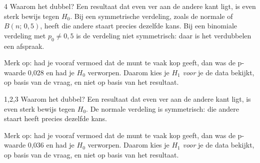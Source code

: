 \begin{alleenvoor}{4}
Waarom het dubbel? Een resultaat dat even ver aan de andere kant ligt, is even sterk bewijs tegen $H_0$. Bij een symmetrische verdeling, zoals de normale of $B(n;\, 0{,}5)$, heeft die andere staart precies dezelfde kans. Bij een binomiale verdeling met $p_0 \neq 0{,}5$ is de verdeling niet symmetrisch: daar is het verdubbelen een afspraak.


Merk op: had je vooraf vermoed dat de munt te vaak kop geeft, dan was de p-waarde 0,028 en had je $H_0$ verworpen. Daarom kies je $H_1$ \textit{voor} je de data bekijkt, op basis van de vraag, en niet op basis van het resultaat.
\end{alleenvoor}
\begin{alleenvoor}{1,2,3}
Waarom het dubbel? Een resultaat dat even ver aan de andere kant ligt, is even sterk bewijs tegen $H_0$. De normale verdeling is symmetrisch: die andere staart heeft precies dezelfde kans.


Merk op: had je vooraf vermoed dat de munt te vaak kop geeft, dan was de p-waarde 0,036 en had je $H_0$ verworpen. Daarom kies je $H_1$ \textit{voor} je de data bekijkt, op basis van de vraag, en niet op basis van het resultaat.
\end{alleenvoor}

